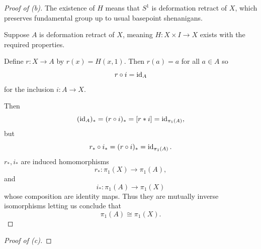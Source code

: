 \documentclass[11pt]{article}
\begin{document}
\begin{proof}[Proof of (b)]
    The existence of $H$ means that 
    $S^1$ is deformation retract of $X$, 
    which preserves fundamental group up to 
    usual basepoint shenanigans. 

    Suppose $A$ is deformation retract of $X$, meaning 
    $H : X \times I \to X$ exists with the required 
    properties. 

    Define $r : X \to A$ by $r(x) = H(x,1)$. 
    Then $r(a) = a$ for all $a \in A$ so 
    \[
        r \circ i = \operatorname{id}_A 
    \]
    for the inclusion $i : A \to X$. 

    Then 
    \[
        (\operatorname{id}_A)_* = (r\circ i)_* 
        = [r * i] = \operatorname{id}_{\pi_1(A)}, 
    \]
    but 
    \[
        r_* \circ i_* = (r \circ i)_* = \operatorname{id}_{\pi_1(A)}.
    \]
    $r_*, i_*$ are induced homomorphisms 
    \[
        r_* : \pi_1(X) \to \pi_1(A), 
    \]
    and 
    \[
        i_* : \pi_1(A) \to \pi_1(X)
    \]
    whose composition are identity maps. 
    Thus they are mutually inverse isomorphisms letting 
    us conclude that 
    \[
        \pi_1(A) \cong \pi_1(X).
    \]
\end{proof}

\begin{proof}[Proof of (c)]
    
\end{proof}
\end{document}
